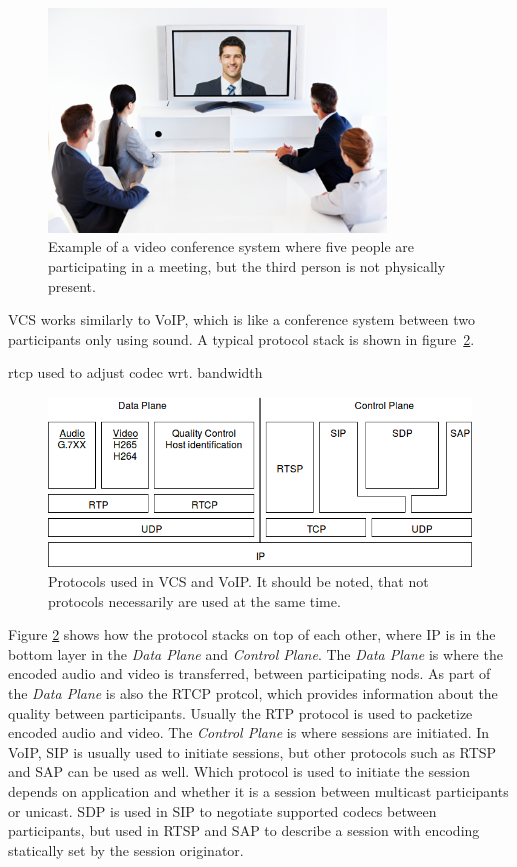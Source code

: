 \begin{figure}[H]
	\centering
	\includegraphics[width=0.8\textwidth]{figures/vcs_overview.png}
	\caption{Example of a video conference system where five people are participating in a meeting, but the third person is not physically present.} \label{fig:design:vcs}
\end{figure}

\ac{VCS} works similarly to \ac{VoIP}, which is like a conference system between two participants only using sound. A typical protocol stack is shown in figure~\ref{fig:design:protocolstack}. 

rtcp used to adjust codec wrt. bandwidth
\begin{figure}[H]
	\centering
	\includegraphics[width=\textwidth]{figures/protocol_stack}
	\caption{Protocols used in VCS and VoIP. It should be noted, that not protocols necessarily are used at the same time.}
	\label{fig:design:protocolstack}
\end{figure}

Figure \ref{fig:design:protocolstack} shows how the protocol stacks on top of each other, where IP is in the bottom layer in the \textit{Data Plane} and \textit{Control Plane}. The  \textit{Data Plane} is where the encoded audio and video is transferred, between participating nods. As part of the \textit{Data Plane} is also the RTCP protcol, which provides information about the quality between participants. Usually the RTP protocol is used to packetize encoded audio and video. The \textit{Control Plane} is where sessions are initiated. In VoIP, SIP is usually used to initiate sessions, but other protocols such as RTSP and SAP can be used as well. Which protocol is used to initiate the session depends on application and whether it is a session between multicast participants or unicast. SDP is used in SIP to negotiate supported codecs between participants, but used in RTSP and SAP to describe a session with encoding statically set by the session originator.\citep{voip_fundamentals}

